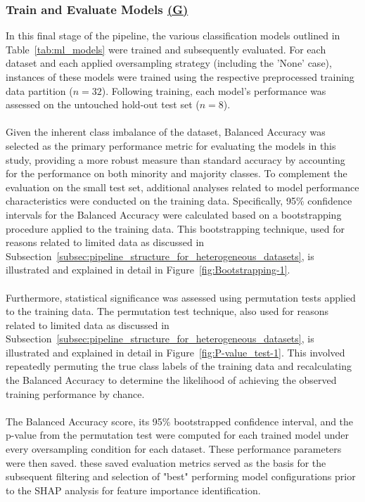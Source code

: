 \documentclass[12pt,a4paper]{report}
\begin{document}
\subsubsection*{Train and Evaluate Models \hyperref[fig:pipeline-2]{(G)}}
In this final stage of the pipeline, the various classification models outlined in Table~\ref{tab:ml_models} were trained and subsequently evaluated. For each dataset and each applied oversampling strategy (including the 'None' case), instances of these models were trained using the respective preprocessed training data partition ($n=32$). Following training, each model's performance was assessed on the untouched hold-out test set ($n=8$).\\
\\
Given the inherent class imbalance of the dataset, Balanced Accuracy was selected as the primary performance metric for evaluating the models in this study, providing a more robust measure than standard accuracy by accounting for the performance on both minority and majority classes. To complement the evaluation on the small test set, additional analyses related to model performance characteristics were conducted on the training data. Specifically, 95\% confidence intervals for the Balanced Accuracy were calculated based on a bootstrapping procedure applied to the training data. This bootstrapping technique, used for reasons related to limited data as discussed in Subsection~\ref{subsec:pipeline_structure_for_heterogeneous_datasets}, is illustrated and explained in detail in Figure~\ref{fig:Bootstrapping-1}.\\
\\
Furthermore, statistical significance was assessed using permutation tests applied to the training data. The permutation test technique, also used for reasons related to limited data as discussed in Subsection~\ref{subsec:pipeline_structure_for_heterogeneous_datasets}, is illustrated and explained in detail in Figure~\ref{fig:P-value_test-1}. This involved repeatedly permuting the true class labels of the training data and recalculating the Balanced Accuracy to determine the likelihood of achieving the observed training performance by chance.\\
\\
The Balanced Accuracy score, its 95\% bootstrapped confidence interval, and the p-value from the permutation test were computed for each trained model under every oversampling condition for each dataset. These performance parameters were then saved. these saved evaluation metrics served as the basis for the subsequent filtering and selection of "best" performing model configurations prior to the SHAP analysis for feature importance identification.
\end{document}
